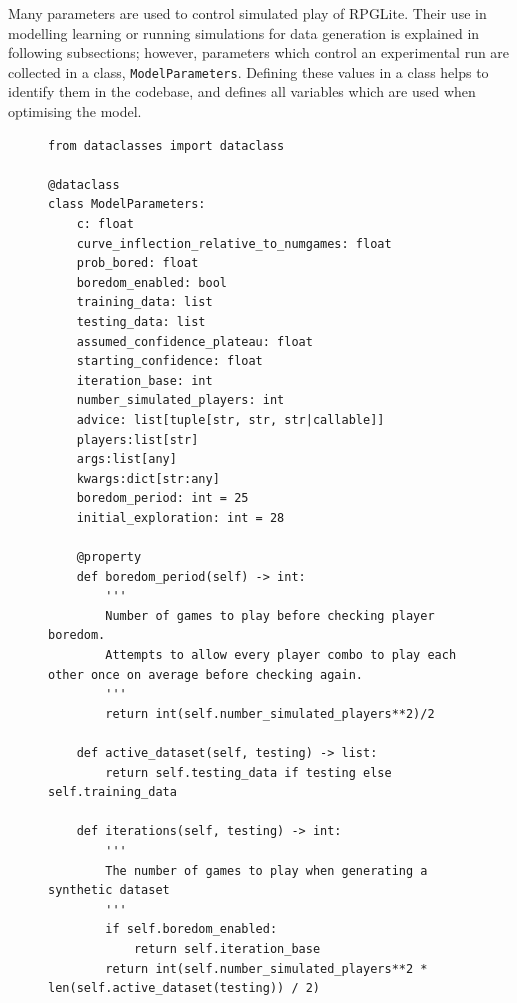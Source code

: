 Many parameters are used to control simulated play of RPGLite. Their use in
modelling learning or running simulations for data generation is explained in
following subsections; however, parameters which control an experimental run are
collected in a class, \lstinline{ModelParameters}. Defining these values in a
class helps to identify them in the codebase, and defines all variables which
are used when optimising the model.

\begin{figure}
  \begin{center}
    \begin{lstlisting}
from dataclasses import dataclass

@dataclass
class ModelParameters:
    c: float
    curve_inflection_relative_to_numgames: float
    prob_bored: float
    boredom_enabled: bool
    training_data: list
    testing_data: list
    assumed_confidence_plateau: float
    starting_confidence: float
    iteration_base: int
    number_simulated_players: int
    advice: list[tuple[str, str, str|callable]]
    players:list[str]
    args:list[any]
    kwargs:dict[str:any]
    boredom_period: int = 25
    initial_exploration: int = 28

    @property
    def boredom_period(self) -> int:
        '''
        Number of games to play before checking player boredom.
        Attempts to allow every player combo to play each other once on average before checking again.
        '''
        return int(self.number_simulated_players**2)/2

    def active_dataset(self, testing) -> list:
        return self.testing_data if testing else self.training_data

    def iterations(self, testing) -> int:
        '''
        The number of games to play when generating a synthetic dataset
        '''
        if self.boredom_enabled:
            return self.iteration_base
        return int(self.number_simulated_players**2 * len(self.active_dataset(testing)) / 2)


\end{lstlisting}
\end{center}
\end{figure}
